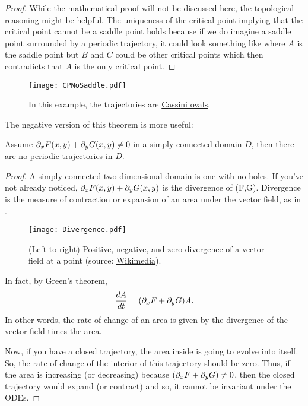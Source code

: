 \begin{proof}
	While the mathematical proof will not be discussed here, the topological reasoning might be helpful. 
	The uniqueness of the critical point implying that the critical point cannot be a saddle point holds because if we do imagine a saddle point surrounded by a periodic trajectory, it could look something like  where $A$ is the saddle point but $B$ and $C$ could be other critical points which then contradicts that $A$ is the only critical point.
\end{proof}

\begin{figure}[!ht]
	\centering
	\texttt{[image: CPNoSaddle.pdf]}
	\caption{In this example, the trajectories are \href{https://mathworld.wolfram.com/CassiniOvals.html}{Cassini ovals}.}
	\label{fig:cpnosaddle}
\end{figure}

The negative version of this theorem is more useful:

\begin{theorem}\label{thrm:periodictraj2}
	Assume $\partial_x F(x,y) + \partial_y G(x,y) \neq 0$ in a simply connected domain $D$, then there are no periodic trajectories in $D$.
\end{theorem}

\begin{proof}
	A simply connected two-dimensional domain is one with no holes. If you've not already noticed, $\partial_x F(x,y) + \partial_y G(x,y)$ is the divergence of (F,G). Divergence is the measure of contraction or expansion of an area under the vector field, as in .
	
	\begin{figure}[!ht]
		\centering
		\texttt{[image: Divergence.pdf]}
		\caption{(Left to right) Positive, negative, and zero divergence of a vector field at a point (source: \href{https://commons.wikimedia.org/wiki/File:Divergence_(captions).svg}{Wikimedia}).}
		\label{fig:divergence}
	\end{figure}
	
	In fact, by Green's theorem,
	\[
	\frac{dA}{dt} = (\partial_x F + \partial_y G)A.
	\]
	In other words, the rate of change of an area is given by the divergence of the vector field times the area.
	
	Now, if you have a closed trajectory, the area inside is going to evolve into itself. So, the rate of change of the interior of this trajectory should be zero. Thus, if the area is increasing (or decreasing) because $(\partial_x F + \partial_y G) \neq 0$, then the closed trajectory would expand (or contract) and so, it cannot be invariant under the ODEs.
\end{proof}

